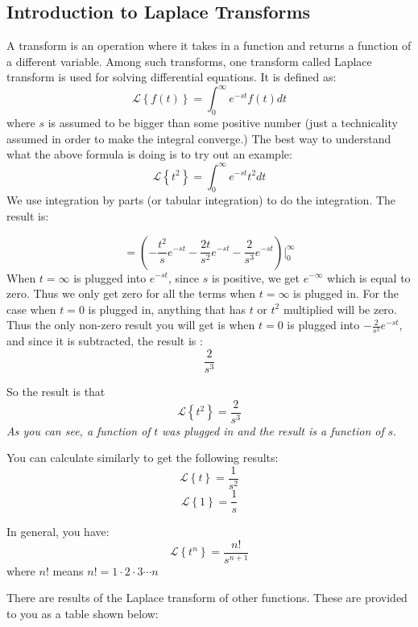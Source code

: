 \documentclass[12pt]{report}
\begin{document}
\subsection*{Introduction to Laplace Transforms}

A transform is an operation where it takes in a function and returns a function of a different variable. Among such transforms, one transform called Laplace transform is used for solving differential equations. It is defined as:
$$ \mathscr{L} \left\{ f(t) \right\}= \int_0^{\infty}  e^{-st} f(t) dt $$
where $s$ is assumed to be bigger than some positive number (just a technicality assumed in order to make the integral converge.)
The best way to understand what the above formula is doing is to try out an example:
$$ \mathscr{L} \left\{t^2 \right\}= \int_0^{\infty} e^{-st} t^2 dt$$
We use integration by parts (or tabular integration) to do the integration. The result is:

$$ = \left(-\frac{t^2}{s} e^{-st} -\frac{2t}{s^2} e^{-st} - \frac{2}{s^3} e^{-st} \right) \Bigg\vert_0^{\infty} $$
When $t=\infty$ is plugged into $e^{-st}$, since $s$ is positive, we get $e^{-\infty}$ which is equal to zero. Thus we only get zero for all the terms when $t=\infty$ is plugged in. For the case when $t=0$ is plugged in, anything that has $t$ or $t^2$ multiplied will be zero. Thus the only non-zero result you will get is when $t=0$ is plugged into $- \frac{2}{s^3} e^{-st} $, and since it is subtracted, the result is :
$$\frac{2}{s^3}$$

So the result is that
$$ \mathscr{L} \left\{t^2\right\}= \frac{2}{s^3}$$
\textit{As you can see, a function of} $t$ \textit{was plugged in and the result is a function of} $s$.

You can calculate similarly to get the following results:
$$ \mathscr{L} \left\{t\right\}= \frac{1}{s^2}$$
$$ \mathscr{L} \left\{1\right\}= \frac{1}{s}$$

In general, you have:
$$ \mathscr{L} \left\{t^n\right\}= \frac{n!}{s^{n+1}}$$
where $n!$ means $n!=1\cdot 2 \cdot 3 \cdots n$

There are results of the Laplace transform of other functions. These are provided to you as a table  shown below:

\begin{center}  \end{center}
\end{document}
